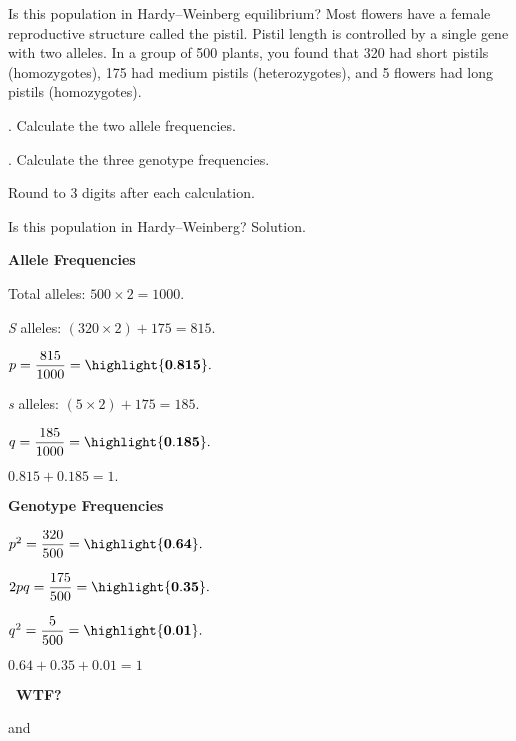 \documentclass[t]{beamer}
\begin{document}
\begin{frame}{Is this population in Hardy--Weinberg equilibrium?}
	\vspace{-1\baselineskip}
	\hangpara Most flowers have a female reproductive structure called the pistil. Pistil length is controlled by a single gene with two alleles. In a group of 500 plants, you found that 320 had short pistils (homozygotes), 175 had medium pistils (heterozygotes), and 5 flowers had long pistils (homozygotes). 

	. Calculate the two allele frequencies.

	. Calculate the three genotype frequencies.

	\hangpara Round to 3 digits after each calculation.
\end{frame}
%
{
\begin{frame}{Is this population in Hardy--Weinberg? Solution.}
\vspace{-1\baselineskip}
\begin{multicols}{2}

	\hangpara \textbf{Allele Frequencies}
	
	\hangpara Total alleles: $500 \times 2 = 1000.$
	
	\hangpara \emph{S} alleles: $(320 \times 2) + 175 = 815.$
	
	\hangpara $p = \dfrac{815}{1000} = \highlight{\mathbf{0.815}}.$

	\hangpara \emph{s} alleles: $(5 \times 2) + 175 = 185.$ 

	\hangpara $q = \dfrac{185}{1000} = \highlight{\mathbf{0.185}}.$
	
	\hangpara $0.815 + 0.185 = 1.$ \checkmark

\columnbreak

	\hangpara \textbf{Genotype Frequencies}
	
	\hangpara $p^2 = \dfrac{320}{500} = \highlight{\mathbf{0.64}}.$ 

	\hangpara $2pq = \dfrac{175}{500} = \highlight{\mathbf{0.35}}.$

	\hangpara $q^2 = \dfrac{5}{500} = \highlight{\mathbf{0.01}}.$

	\hangpara $0.64 + 0.35 + 0.01 = 1$ \checkmark
	
	\hangpara {}
	\textbf{\ WTF?}\vspace{-0.5\baselineskip}
	
	\hangpara {} and
	

\end{multicols}
\end{frame}
}
\end{document}
